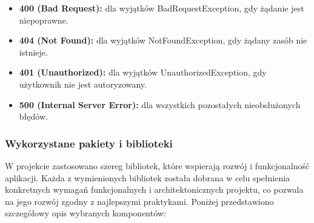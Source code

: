 \documentclass[12pt,a4paper]{article}
\begin{document}
\begin{itemize}
    \item \textbf{400 (Bad Request):} dla wyjątków BadRequestException, gdy żądanie jest niepoprawne.
    \item \textbf{404 (Not Found):} dla wyjątków NotFoundException, gdy żądany zasób nie istnieje.
    \item \textbf{401 (Unauthorized):} dla wyjątków UnauthorizedException, gdy użytkownik nie jest autoryzowany.
    \item \textbf{500 (Internal Server Error):} dla wszystkich pozostałych nieobsłużonych błędów.
\end{itemize}

\newpage

\subsubsection{Wykorzystane pakiety i biblioteki}

W projekcie zastosowano szereg bibliotek, które wspierają rozwój i funkcjonalność aplikacji. Każda z wymienionych bibliotek została dobrana w celu spełnienia konkretnych wymagań funkcjonalnych i architektonicznych projektu, co pozwala na jego rozwój zgodny z najlepszymi praktykami. Poniżej przedstawiono szczegółowy opis wybranych komponentów:
\end{document}
